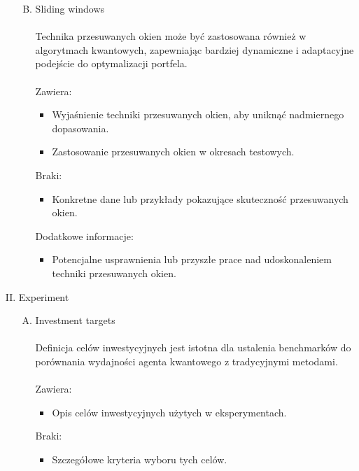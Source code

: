 \documentclass[polish,envcountsect,10pt]{article}
\begin{document}
\begin{enumerate}[I.]
\begin{enumerate}[A.]
\begin{itemize}
            \end{itemize}
          \item Sliding windows
            \\
            \\
            Technika przesuwanych okien może być zastosowana również w algorytmach kwantowych, zapewniając bardziej dynamiczne i adaptacyjne podejście do optymalizacji portfela.
            \\
            \\
            Zawiera:
                \begin{itemize}
                  \item Wyjaśnienie techniki przesuwanych okien, aby uniknąć nadmiernego dopasowania.
                  \item Zastosowanie przesuwanych okien w okresach testowych.
                \end{itemize}
            Braki:
                \begin{itemize}
                  \item Konkretne dane lub przykłady pokazujące skuteczność przesuwanych okien.
                \end{itemize}
            Dodatkowe informacje:
                \begin{itemize}
                  \item Potencjalne usprawnienia lub przyszłe prace nad udoskonaleniem techniki przesuwanych okien.
                \end{itemize}
        \end{enumerate}
    \item  Experiment
        \begin{enumerate}[A.]
          \item Investment targets
            \\
            \\
            Definicja celów inwestycyjnych jest istotna dla ustalenia benchmarków do porównania wydajności agenta kwantowego z tradycyjnymi metodami.
            \\
            \\
            Zawiera:
                \begin{itemize}
                  \item Opis celów inwestycyjnych użytych w eksperymentach.
                \end{itemize}
            Braki:
                \begin{itemize}
                  \item Szczegółowe kryteria wyboru tych celów.

\end{itemize}
\end{enumerate}
\end{enumerate}
\end{document}
